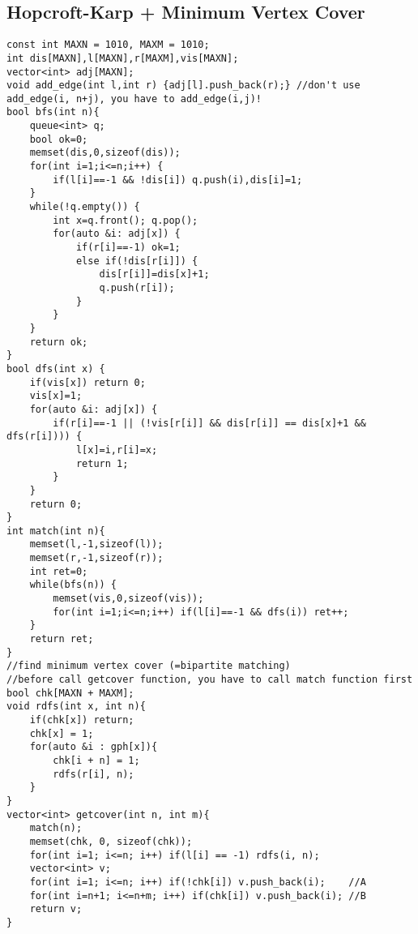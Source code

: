 \documentclass[landscape, 8pt, a4paper, oneside, twocolumn]{extarticle}
\begin{document}
\subsection {Hopcroft-Karp + Minimum Vertex Cover}
\begin{verbatim}
const int MAXN = 1010, MAXM = 1010;
int dis[MAXN],l[MAXN],r[MAXM],vis[MAXN];
vector<int> adj[MAXN];
void add_edge(int l,int r) {adj[l].push_back(r);} //don't use add_edge(i, n+j), you have to add_edge(i,j)!
bool bfs(int n){
    queue<int> q;
    bool ok=0;
    memset(dis,0,sizeof(dis));
    for(int i=1;i<=n;i++) {
        if(l[i]==-1 && !dis[i]) q.push(i),dis[i]=1;
    }
    while(!q.empty()) {
        int x=q.front(); q.pop();
        for(auto &i: adj[x]) {
            if(r[i]==-1) ok=1;
            else if(!dis[r[i]]) {
                dis[r[i]]=dis[x]+1;
                q.push(r[i]);
            }
        }
    }
    return ok;
}
bool dfs(int x) {
    if(vis[x]) return 0;
    vis[x]=1;
    for(auto &i: adj[x]) {
        if(r[i]==-1 || (!vis[r[i]] && dis[r[i]] == dis[x]+1 && dfs(r[i]))) {
            l[x]=i,r[i]=x;
            return 1;
        }
    }
    return 0;
}
int match(int n){
    memset(l,-1,sizeof(l));
    memset(r,-1,sizeof(r));
    int ret=0;
    while(bfs(n)) {
        memset(vis,0,sizeof(vis));
        for(int i=1;i<=n;i++) if(l[i]==-1 && dfs(i)) ret++;
    }
    return ret;
}
//find minimum vertex cover (=bipartite matching)
//before call getcover function, you have to call match function first
bool chk[MAXN + MAXM];
void rdfs(int x, int n){
	if(chk[x]) return;
	chk[x] = 1;
	for(auto &i : gph[x]){
		chk[i + n] = 1;
		rdfs(r[i], n);
	}
}
vector<int> getcover(int n, int m){
	match(n);
	memset(chk, 0, sizeof(chk));
	for(int i=1; i<=n; i++) if(l[i] == -1) rdfs(i, n);
	vector<int> v;
	for(int i=1; i<=n; i++) if(!chk[i]) v.push_back(i);    //A
	for(int i=n+1; i<=n+m; i++) if(chk[i]) v.push_back(i); //B
	return v;
}
\end{verbatim}
\newpage
\end{document}
